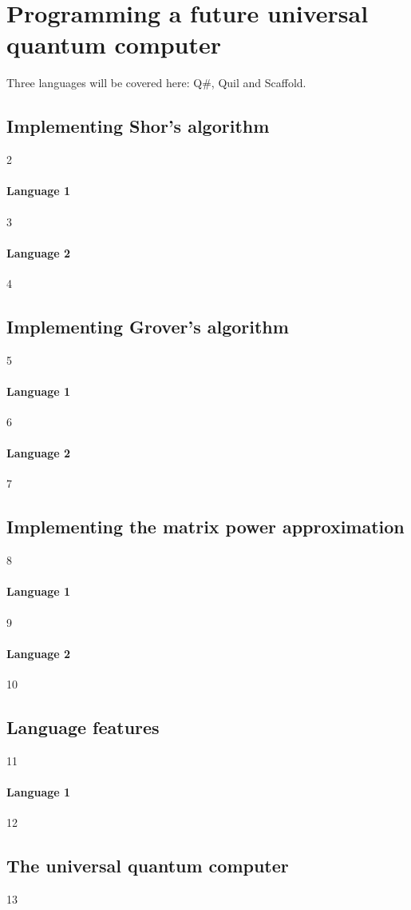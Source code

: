 \chapter{Programming a future universal quantum computer}\label{Programmingquantumcomputer}
Three languages will be covered here: Q\#, Quil and Scaffold.
\section{Implementing Shor's algorithm}
2
\subsubsection{Language 1}
3
\subsubsection{Language 2}
4
\section{Implementing Grover's algorithm}
5
\subsubsection{Language 1}
6
\subsubsection{Language 2}
7
\section{Implementing the matrix power approximation}
8
\subsubsection{Language 1}
9
\subsubsection{Language 2}
10
\section{Language features}
11
\subsubsection{Language 1}
12

\section{The universal quantum computer}
13
